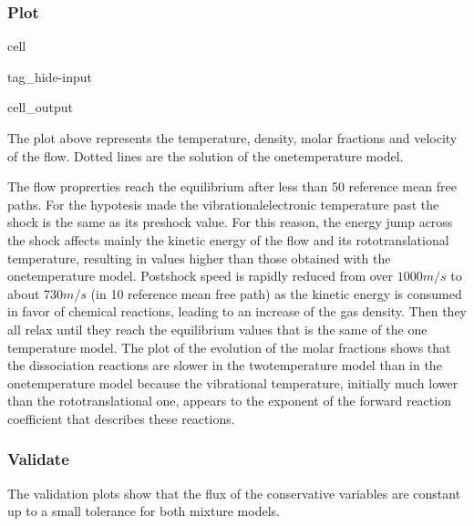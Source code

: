 \documentclass[letterpaper,10pt,english]{jupyterBook}
\begin{document}
\subsubsection{Plot}
\label{\detokenize{Results/Results:plot}}
\begin{sphinxuseclass}{cell}
\begin{sphinxuseclass}{tag_hide-input}\begin{sphinxVerbatimOutput}

\begin{sphinxuseclass}{cell_output}
\noindent{}

\end{sphinxuseclass}\end{sphinxVerbatimOutput}

\end{sphinxuseclass}
\end{sphinxuseclass}
\sphinxAtStartPar
The plot above represents the temperature, density, molar fractions and velocity of the flow. Dotted lines are the solution of the one\sphinxhyphen{}temperature model. 

\sphinxAtStartPar
The flow proprerties reach the equilibrium after less than 50 reference mean free paths. For the hypotesis made the vibrational\sphinxhyphen{}electronic temperature past the shock is the same as its pre\sphinxhyphen{}shock value. For this reason, the energy jump across the shock affects mainly the kinetic energy of the flow and its roto\sphinxhyphen{}translational temperature, resulting in values higher than those obtained with the one\sphinxhyphen{}temperature model. Post\sphinxhyphen{}shock speed is rapidly reduced from over \(1000 m/s\) to about \(730 m/s\) (in 10 reference mean free path) as the kinetic energy is consumed in favor of chemical reactions, leading to an increase of the gas density. Then they all relax until they reach the equilibrium values that is the same of the one temperature model. 
The plot of the evolution of the molar fractions shows that the dissociation reactions are slower in the two\sphinxhyphen{}temperature model than in the one\sphinxhyphen{}temperature model because the vibrational temperature, initially much lower than the roto\sphinxhyphen{}translational one, appears to the exponent of the forward reaction coefficient that describes these reactions.


\subsubsection{Validate}
\label{\detokenize{Results/Results:validate}}
\sphinxAtStartPar
The validation plots show that the flux of the conservative variables are constant up to a small tolerance for both mixture models.
\end{document}
